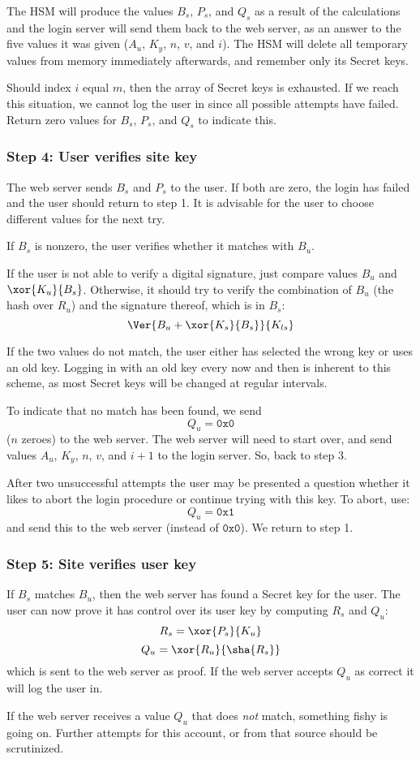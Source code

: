 The HSM will produce the values $B_s$,
$P_s$,
and $Q_s$ as a result of the calculations and the login server will send them back to the web server,
as an answer to the five values it was given ($A_u$, $K_y$, $n$, $v$, and $i$).
The HSM will delete all temporary values from memory immediately afterwards,
and remember only its Secret keys.
\par
Should index $i$ equal $m$, then the array of Secret keys is exhausted.
If we reach this situation, we cannot log the user in since all possible attempts have failed.
Return zero values for $B_s$, $P_s$, and $Q_s$ to indicate this.

\subsubsection{Step 4: User verifies site key}
\label{sec:login_step4}
The web server sends $B_s$ and $P_s$ to the user.
If both are zero, the login has failed and the user should return to step 1.
It is advisable for the user to choose different values for the next try.
\par
If $B_s$ is nonzero, the user verifies whether it matches with $B_u$.
\par
If the user is not able to verify a digital signature,
just compare values $B_u$ and $\xor{K_u}{B_s}$.
Otherwise,
it should try to verify the combination of $B_u$
(the hash over $R_u$)
and the signature thereof,
which is in $B_s$:
\[\Ver{B_u+\xor{K_s}{B_s}}{K_{ls}}\]
\par
If the two values do not match,
the user either has selected the wrong key or uses an old key.
Logging in with an old key every now and then is inherent to this scheme,
as most Secret keys will be changed at regular intervals.
\par
To indicate that no match has been found, we send
\[Q_u=\mathtt{0x0}\]
($n$ zeroes) to the web server.
The web server will need to start over, and send values $A_u$, $K_y$, $n$, $v$, and $i+1$ to the login server.
So, back to step 3.
\par
After two unsuccessful attempts the user may be presented a question
whether it likes to abort the login procedure or continue trying with this key.
To abort, use:
\[Q_u=\mathtt{0x1}\]
and send this to the web server
(instead of $\mathtt{0x0}$).
We return to step 1.

\subsubsection{Step 5: Site verifies user key}
\label{sec:login_step5}
If $B_s$ matches $B_u$, then the web server has found a Secret key for the user.
The user can now prove it has control over its user key by computing $R_s$ and $Q_u$:
\[R_s=\xor{P_s}{K_u}\]
\[Q_u=\xor{R_u}{\sha{R_s}}\]
which is sent to the web server as proof.
If the web server accepts $Q_u$ as correct it will log the user in.
\par
If the web server receives a value $Q_u$ that does \emph{not} match,
something fishy is going on.
Further attempts for this account, or from that source should be scrutinized.

